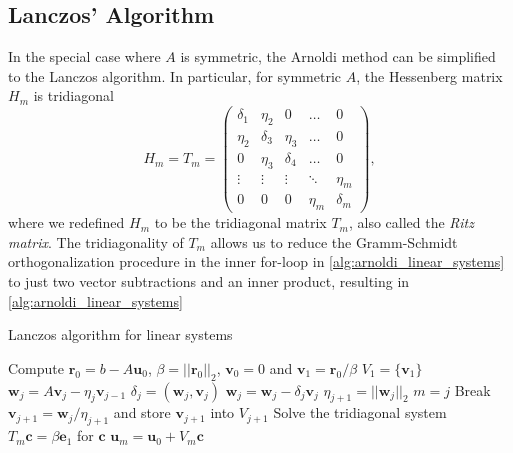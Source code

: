 \subsection{Lanczos' Algorithm}
In the special case where $A$ is symmetric, the Arnoldi method can be simplified to the Lanczos algorithm. In particular, for symmetric $A$, the Hessenberg matrix $H_m$ is tridiagonal
\begin{equation}
  H_m = T_m =
  \begin{pmatrix}
    \delta_1 & \eta_2   & 0        & \dots  & 0        \\
    \eta_2   & \delta_3 & \eta_3   & \dots  & 0        \\
    0        & \eta_3   & \delta_4 & \dots  & 0        \\
    \vdots   & \vdots   & \vdots   & \ddots & \eta_m   \\
    0        & 0        & 0        & \eta_m & \delta_m
  \end{pmatrix},
  \label{eq:lanczos_tridiagonal}
\end{equation}
where we redefined $H_m$ to be the tridiagonal matrix $T_m$, also called the \textit{Ritz matrix}. The tridiagonality of $T_m$ allows us to reduce the Gramm-Schmidt orthogonalization procedure in the inner for-loop in \cref{alg:arnoldi_linear_systems} to just two vector subtractions and an inner product, resulting in \cref{alg:arnoldi_linear_systems}
\begin{algorithm}
  \caption{Lanczos algorithm for linear systems \cite[Algorithm 6.16]{iter_method_saad}}
  \begin{algorithmic}
    \State Compute $\mathbf{r}_0 = b - A\mathbf{u}_0$, $\beta = ||\mathbf{r}_0||_2$, $\mathbf{v}_0 = 0$ and $\mathbf{v}_1 = \mathbf{r}_0 / \beta$
    \State $V_{1} = \{\mathbf{v}_1\}$
    \State $\mathbf{w}_j = A\mathbf{v}_j - \eta_j \mathbf{v}_{j-1}$
    \State $\delta_j = (\mathbf{w}_j, \mathbf{v}_j)$
    \State $\mathbf{w}_j = \mathbf{w}_j - \delta_j \mathbf{v}_j$
    \State $\eta_{j+1} = ||\mathbf{w}_j||_2$
    \State $m = j$
    \State Break
    \EndIf
    \State $\mathbf{v}_{j+1} = \mathbf{w}_j / \eta_{j+1}$ and store $\mathbf{v}_{j+1}$ into $V_{j+1}$
    \EndFor
    \State Solve the tridiagonal system $T_m \mathbf{c} = \beta \mathbf{e}_1$ for $\mathbf{c}$
    \State $\mathbf{u}_m = \mathbf{u}_0 + V_m \mathbf{c}$
  \end{algorithmic}
  \label{alg:lanczos_linear_systems}
\end{algorithm}

